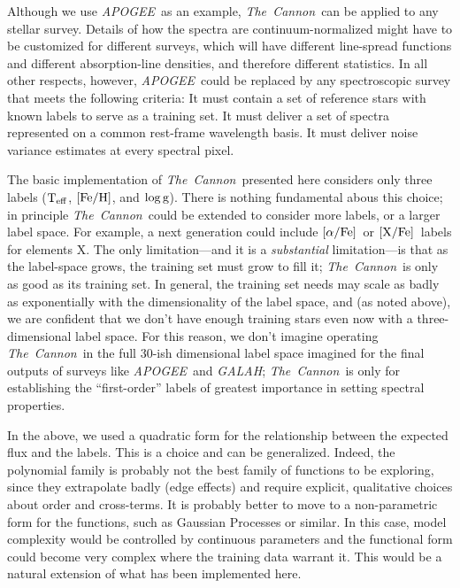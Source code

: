\documentclass[12pt, preprint]{aastex}
\newcommand{\teff}{\mbox{$\rm T_{eff}$}}
\newcommand{\feh}{\mbox{$\rm [Fe/H]$}}
\newcommand{\xfe}{\mbox{$\rm [X/Fe]$}}
\newcommand{\alphafe}{\mbox{$\rm [\alpha/Fe]$}}
\newcommand{\logg}{\mbox{$\rm \log g$}}
\newcommand{\tc}{\textsl{The~Cannon}}
\newcommand{\apogee}{\textsl{APOGEE}}
\newcommand{\galah}{\textsl{GALAH}}
\begin{document}

 
Although we use \apogee\ as an example, \tc\ can be applied to
any stellar survey.
Details of how the spectra are continuum-normalized might have to be
customized for different surveys, which will have different
line-spread functions and different absorption-line densities, and
therefore different statistics.
In all other respects, however, \apogee\ could be replaced by any spectroscopic
survey that meets the following criteria:
It must contain a set of reference stars with known labels to serve as
a training set.
It must deliver a set of spectra represented on a common rest-frame
wavelength basis.
It must deliver noise variance estimates at every spectral pixel.



The basic implementation of \tc\ presented here considers only three
labels (\teff, \feh, and \logg).
There is nothing fundamental abous this choice; in principle
\tc\ could be extended to consider more labels, or a larger
label space.
For example, a next generation could include \alphafe\ or \xfe\
labels for elements X.
The only limitation---and it is a \emph{substantial} limitation---is
that as the label-space grows, the training set must grow to fill it;
\tc\ is only as good as its training set.
In general, the training set needs may scale as badly as exponentially
with the dimensionality of the label space, and (as noted above), we
are confident that we don't have enough training stars even now with
a three-dimensional label space.
For this reason, we don't imagine operating \tc\ in the full 30-ish
dimensional label space imagined for the final outputs of surveys like
\apogee\ and \galah; \tc\ is only for establishing the ``first-order'' labels of
greatest importance in setting spectral properties.


In the above, we used a quadratic form for the
relationship between the expected flux and the labels.
This is a choice and can be generalized.
Indeed, the polynomial family is probably not the best family of
functions to be exploring, since they extrapolate badly (edge effects)
and require explicit, qualitative choices about order and cross-terms.
It is probably better to move to a non-parametric form for the functions,
such as Gaussian Processes or similar.
In this case, model complexity would be controlled by continuous
parameters and the functional form could become very complex where the
training data warrant it.
This would be a natural extension of what has been implemented here.
\end{document}

